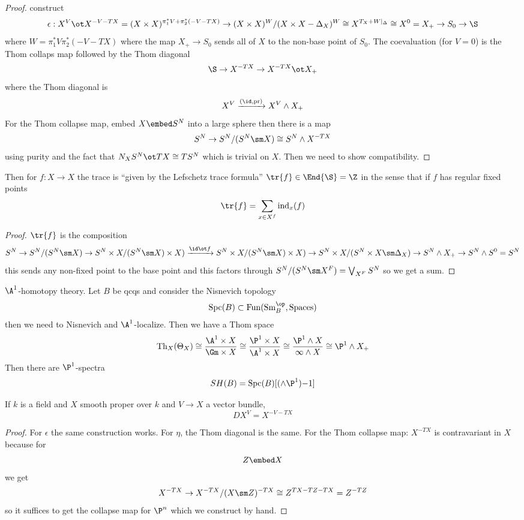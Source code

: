 \documentclass{article}
\newcommand{\Th}{\mathrm{Th}}
\newcommand{\Spc}{\mathrm{Spc}}
\newcommand{\pr}{\mathrm{pr}}
\begin{document}
\begin{proof}
construct
\[ \epsilon : X^V \ot X^{-V - TX} = (X \times X)^{\pi_1^* V + \pi_2^* (-V - T X)} \to (X \times X)^{W} / (X \times X - \Delta_X)^W \cong X^{T_X + W |_{\Delta}} \cong X^{0} = X_+ \to S_0 \to \S \]
where $W = \pi_1^* V \pi_2^* (-V - T X)$ where the map $X_{+} \to S_0$ sends all of $X$ to the non-base point of $S_0$. The coevaluation (for $V = 0$) is the Thom collaps map followed by the Thom diagonal
\[ \S \to X^{-T X} \to X^{-T X} \ot X_{+} \]
where the Thom diagonal is
\[ X^V \xrightarrow{(\id, \pr)} X^V \wedge X_+ \]
For the Thom collapse map, embed $X \embed S^N$ into a large sphere then there is a map
\[ S^N \to S^N / (S^N \sm X) \cong S^N \wedge X^{-TX} \]
using purity and the fact that $N_{X} S^N \ot TX \cong T S^N$ which is trivial on $X$. Then we need to show compatibility. 
\end{proof}

Then for $f : X \to X$ the trace is ``given by the Lefschetz trace formula'' $\tr{f} \in \End{\S} = \Z$ in the sense that if $f$ has regular fixed points
\[ \tr{f} = \sum_{x \in X^f} \mathrm{ind}_x(f) \]

\begin{proof}
$\tr{f}$ is the composition
\[ S^N \to S^N / (S^N \sm X) \to S^N \times X/(S^N \sm X) \times X) \xrightarrow{\id \ot f}   S^N \times X/(S^N \sm X) \times X) \to S^N \times X / (S^N \times X \sm \Delta_X) \to S^N \wedge X_+ \to S^N \wedge S^0 = S^N \]
this sends any non-fixed point to the base point and this factors through $S^N / (S^N \sm X^F) = \bigvee_{X^F} S^N$ so we get a sum. 
\end{proof}

\begin{example}
$\A^1$-homotopy theory. Let $B$ be qcqs and consider the Nisnevich topology
\[ \Spc(B) \subset \mathrm{Fun}(\mathrm{Sm}_B^\op, \mathrm{Spaces}) \]
then we need to Nisnevich and $\A^1$-localize. Then we have a Thom space
\[ \Th_X(\Theta_X) \cong \frac{\A^1 \times X}{\Gm \times X} \cong \frac{\P^1 \times X}{\A^1 \times X} \cong \frac{\P^1 \wedge X}{\infty \wedge X} \cong \P^1 \wedge X_+ \]
Then there are $\P^1$-spectra
\[ SH(B) = \Spc(B)[(\wedge \P^1){-1}] \]
\end{example}

\begin{theorem}
If $k$ is a field and $X$ smooth proper over $k$ and $V \to X$ a vector bundle,
\[ D X^V = X^{-V - TX} \]
\end{theorem}

\begin{proof}
For $\epsilon$ the same construction works. For $\eta$, the Thom diagonal is the same. For the Thom collapse map: $X^{-TX}$ is contravariant in $X$ because for
\[ Z \embed X \]
we get
\[ X^{-TX} \to X^{-TX} / (X \sm Z)^{-TX} \cong Z^{TX - TZ - TX} = Z^{-TZ} \]
so it suffices to get the collapse map for $\P^n$ which we construct by hand. 
\end{proof}
\end{document}
